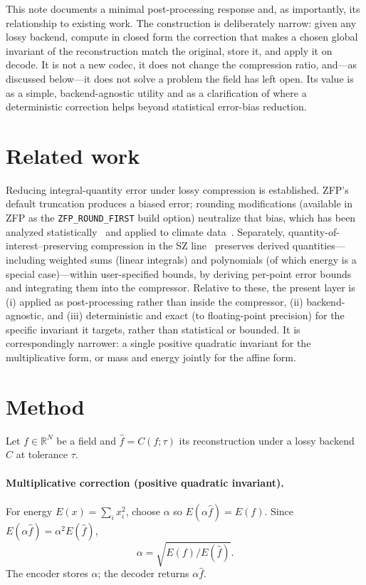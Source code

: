 \documentclass[11pt]{article}
\begin{document}
This note documents a minimal post-processing response and, as importantly, its
relationship to existing work. The construction is deliberately narrow: given
any lossy backend, compute in closed form the correction that makes a chosen
global invariant of the reconstruction match the original, store it, and apply
it on decode. It is not a new codec, it does not change the compression ratio,
and---as discussed below---it does not solve a problem the field has left open.
Its value is as a simple, backend-agnostic utility and as a clarification of
where a deterministic correction helps beyond statistical error-bias reduction.

\section{Related work}
Reducing integral-quantity error under lossy compression is established.
ZFP's default truncation produces a biased error; rounding modifications
(available in ZFP as the \texttt{ZFP\_ROUND\_FIRST} build option) neutralize
that bias, which has been analyzed statistically~\cite{enhancingzfp} and applied
to climate data~\cite{climate}. Separately, quantity-of-interest--preserving
compression in the SZ line~\cite{qoi} preserves derived quantities---including
weighted sums (linear integrals) and polynomials (of which energy is a
special case)---within user-specified bounds, by deriving per-point error
bounds and integrating them into the compressor. Relative to these, the present
layer is (i) applied as post-processing rather than inside the compressor,
(ii) backend-agnostic, and (iii) deterministic and exact (to floating-point
precision) for the specific invariant it targets, rather than statistical or
bounded. It is correspondingly narrower: a single positive quadratic invariant
for the multiplicative form, or mass and energy jointly for the affine form.

\section{Method}
Let $f\in\mathbb{R}^N$ be a field and $\hat f = C(f;\tau)$ its reconstruction
under a lossy backend $C$ at tolerance $\tau$.

\paragraph{Multiplicative correction (positive quadratic invariant).}
For energy $E(x)=\sum_i x_i^2$, choose $\alpha$ so $E(\alpha\hat f)=E(f)$. Since
$E(\alpha\hat f)=\alpha^2 E(\hat f)$,
\begin{equation}
\alpha=\sqrt{E(f)/E(\hat f)}.
\end{equation}
The encoder stores $\alpha$; the decoder returns $\alpha\hat f$.
\end{document}

